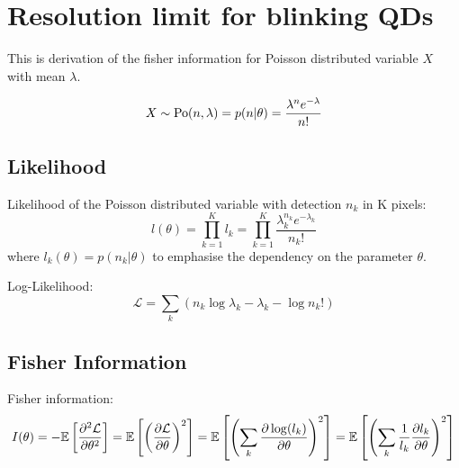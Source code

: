 \chapter{Resolution limit for blinking QDs\label{app:Appendix2}}


This is derivation of the fisher information for Poisson distributed
variable $X$ with mean $\lambda$.

\begin{equation}
X\sim\mathrm{Po}(n,\lambda)=p(n|\theta)=\frac{\lambda^{n}e^{-\lambda}}{n!}
\end{equation}



\section{Likelihood}

Likelihood of the Poisson distributed variable with detection $n_k$ in K pixels: 
%
\begin{equation}
	l(\theta)=\prod_{k=1}^Kl_k=\prod_{k=1}^K\frac{\lambda_k^{n_k}e^{-\lambda_k}}{n_k!}\label{eq:app-Likelihood of Poisson}
\end{equation}
%
where $l_k(\theta)=p(n_k|\theta)$ to emphasise the dependency on the parameter $\theta$.

Log-Likelihood:
\begin{equation}
	\mathcal{L}=\sum_k\left(n_k\log\lambda_k-\lambda_k-\log n_k!\right)
\end{equation}


\section{Fisher Information}

Fisher information:
\begin{equation}
	I(\theta)=-\mathbb{E}\left[\frac{\partial^2\mathcal{L}}{\partial\theta^2}\right]=\mathbb{E}\left[\left(\frac{\partial\mathcal{L}}{\partial\theta}\right)^2\right]=\mathbb{E}\left[\left(\sum_k\frac{\partial\log(l_k)}{\partial\theta}\right)^2\right]=\mathbb{E}\left[\left(\sum_k\frac{1}{l_k}\frac{\partial l_k}{\partial\theta}\right)^2\right]\label{eq:app-Fisher Info Definition}
\end{equation}


